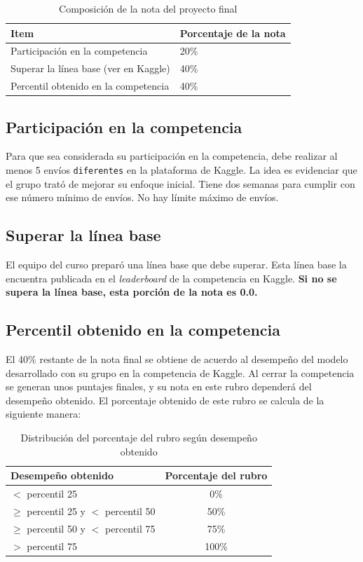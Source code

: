 \documentclass{article}
\begin{document}
\begin{table}[H]
\begin{center}
\caption{Composición de la nota del proyecto final}
    \begin{tabular}{|l|l|}
    \hline
    \textbf{Item}                        & \textbf{Porcentaje de la nota} \\ \hline
    Participación en la competencia      & 20\%                         \\ \hline
    Superar la línea base  (ver en Kaggle)              & 40\%                         \\ \hline
    Percentil obtenido en la competencia & 40\%                         \\ \hline
    \end{tabular}
\end{center}
\end{table}

\subsection{Participación en la competencia}
Para que sea considerada su participación en la competencia, debe realizar al menos 5 envíos \texttt{diferentes} en la plataforma de Kaggle. La idea es evidenciar que el grupo trató de mejorar su enfoque inicial. Tiene dos semanas para cumplir con ese número mínimo de envíos. No hay límite máximo de envíos.

\subsection{Superar la línea base}
El equipo del curso preparó una línea base que debe superar. Esta línea base la encuentra publicada en el \textit{leaderboard} de la competencia en Kaggle. \textbf{Si no se supera la línea base, esta porción de la nota es 0.0.}

\subsection{Percentil obtenido en la competencia}
El 40\% restante de la nota final se obtiene de acuerdo al desempeño del modelo desarrollado con su grupo en la competencia de Kaggle. Al cerrar la competencia se generan unos puntajes finales, y su nota en este rubro dependerá del desempeño obtenido. El porcentaje obtenido de este rubro se calcula de la siguiente manera:

\begin{table}[H]
\centering
\begin{tabular}{|l|c|}
\hline
\textbf{Desempeño obtenido} & \textbf{Porcentaje del rubro} \\ \hline
$<$ percentil 25 & 0\% \\ \hline
$\geq$ percentil 25 y $<$ percentil 50 & 50\% \\ \hline
$\geq$ percentil 50 y $<$ percentil 75 & 75\% \\ \hline
$>$ percentil 75 & 100\% \\ \hline
\end{tabular}
\caption{Distribución del porcentaje del rubro según desempeño obtenido}
\end{table}
\end{document}
